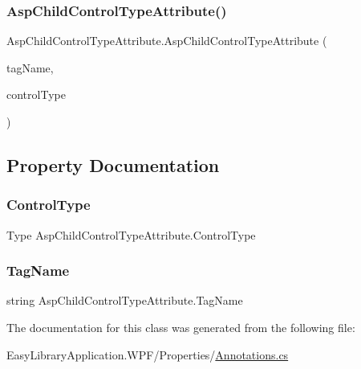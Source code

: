 \subsubsection{\texorpdfstring{Asp\+Child\+Control\+Type\+Attribute()}{AspChildControlTypeAttribute()}}
{\footnotesize\ttfamily Asp\+Child\+Control\+Type\+Attribute.\+Asp\+Child\+Control\+Type\+Attribute (\begin{DoxyParamCaption}\item[{\mbox{[}\+Not\+Null\mbox{]} string}]{tag\+Name,  }\item[{\mbox{[}\+Not\+Null\mbox{]} Type}]{control\+Type }\end{DoxyParamCaption})}



\subsection{Property Documentation}
\mbox{\label{class_asp_child_control_type_attribute_a6c6421f394baa882056b2dfc3efcd284}} 
\subsubsection{\texorpdfstring{Control\+Type}{ControlType}}
{\footnotesize\ttfamily Type Asp\+Child\+Control\+Type\+Attribute.\+Control\+Type\hspace{0.3cm}{\ttfamily [get]}}

\mbox{\label{class_asp_child_control_type_attribute_a9e30613d70a3bcffb32a4664a5d121d2}} 
\subsubsection{\texorpdfstring{Tag\+Name}{TagName}}
{\footnotesize\ttfamily string Asp\+Child\+Control\+Type\+Attribute.\+Tag\+Name\hspace{0.3cm}{\ttfamily [get]}}



The documentation for this class was generated from the following file\+:\begin{DoxyCompactItemize}
\item 
Easy\+Library\+Application.\+W\+P\+F/\+Properties/\mbox{\hyperlink{_annotations_8cs}{Annotations.\+cs}}\end{DoxyCompactItemize}
